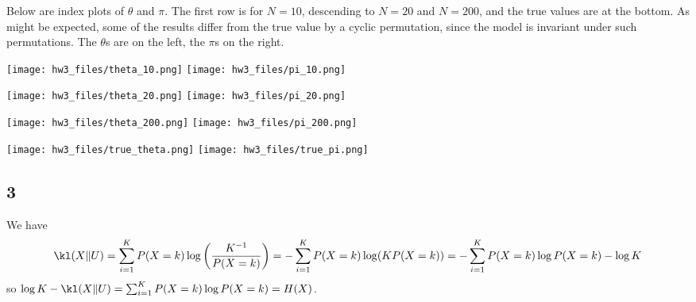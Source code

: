 \documentclass{article}
\begin{document}
Below are index plots of $\theta$ and $\pi$. The first row is for $N=10$, descending to $N=20$ and $N=200$, and the true values are at the bottom. As might be expected, some of the results differ from the true value by a cyclic permutation, since the model is invariant under such permutations. The $\theta$s are on the left, the $\pi$s on the right.

\texttt{[image: hw3\_files/theta\_10.png]}
\texttt{[image: hw3\_files/pi\_10.png]}

\texttt{[image: hw3\_files/theta\_20.png]}
\texttt{[image: hw3\_files/pi\_20.png]}

\texttt{[image: hw3\_files/theta\_200.png]}
\texttt{[image: hw3\_files/pi\_200.png]}

\texttt{[image: hw3\_files/true\_theta.png]}
\texttt{[image: hw3\_files/true\_pi.png]}

\subsection*{3}
We have 
\[\kl(X\|U)=\sum_{i=1}^KP(X=k)\log\left(\frac{K^{-1}}{P(X=k)}\right)=-\sum_{i=1}^KP(X=k)\log(KP(X=k))=-\sum_{i=1}^KP(X=k)\log P(X=k)-\log K\]
so $\log K-\kl(X\|U)=\sum_{i=1}^KP(X=k)\log P(X=k)=H(X)$.
\end{document}
